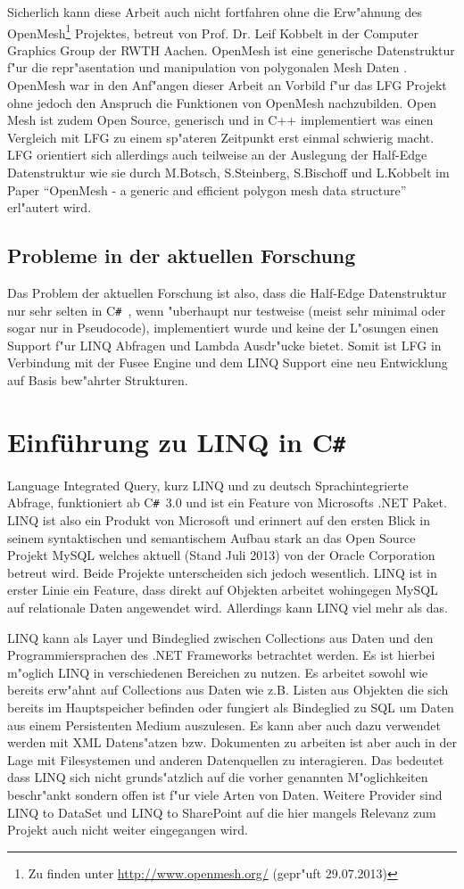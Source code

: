 \documentclass[pagesize, paper=a4, fontsize=12pt,titlepage=true, headings=small, headnosepline, abstractoff, liststotoc, nochapterprefix, plainheadsepline]{scrreprt}
\newcommand{\CS}{C\texttt{\#}}
\newcommand{\CSS}{C\texttt{\# }}
\newcommand{\HES}{Half-Edge Datenstruktur }
\begin{document}
Sicherlich kann diese Arbeit auch nicht fortfahren ohne die Erw"ahnung des OpenMesh\footnote{Zu finden unter \url{http://www.openmesh.org/} (gepr"uft 29.07.2013)} Projektes, betreut von Prof. Dr. Leif Kobbelt in der Computer Graphics Group der RWTH Aachen. OpenMesh ist eine generische Datenstruktur f"ur die repr"asentation und manipulation von polygonalen Mesh Daten \cite{Kobbelt.2013}. OpenMesh war in den Anf"angen dieser Arbeit an Vorbild f"ur das LFG Projekt ohne jedoch den Anspruch die Funktionen von OpenMesh nachzubilden. Open Mesh ist zudem Open Source, generisch und in C++ implementiert was einen Vergleich mit LFG zu einem sp"ateren Zeitpunkt erst einmal schwierig macht. LFG orientiert sich allerdings auch teilweise an der Auslegung der \HES wie sie durch M.Botsch, S.Steinberg, S.Bischoff und L.Kobbelt im Paper "`OpenMesh - a generic and efficient polygon mesh data structure"' \cite{Botsch.2002} erl"autert wird.
		\subsection {Probleme in der aktuellen Forschung}
			Das Problem der aktuellen Forschung ist also, dass die \HES nur sehr selten in \CSS, wenn "uberhaupt nur testweise (meist sehr minimal oder sogar nur in Pseudocode), implementiert wurde und keine der L"osungen einen Support f"ur LINQ Abfragen und Lambda Ausdr"ucke bietet. Somit ist LFG in Verbindung mit der Fusee Engine und dem LINQ Support eine neu Entwicklung auf Basis bew"ahrter Strukturen.
	\section {Einführung zu LINQ in \CS}
		Language Integrated Query, kurz LINQ und zu deutsch Sprachintegrierte Abfrage, funktioniert ab \CSS 3.0 und ist ein Feature von Microsofts .NET Paket. LINQ ist also ein Produkt von Microsoft und erinnert auf den ersten Blick in seinem syntaktischen und semantischem Aufbau stark an das Open Source Projekt MySQL welches aktuell (Stand Juli 2013) von der Oracle Corporation betreut wird. Beide Projekte unterscheiden sich jedoch wesentlich. LINQ ist in erster Linie ein Feature, dass direkt auf Objekten arbeitet wohingegen MySQL auf relationale Daten angewendet wird. Allerdings kann LINQ viel mehr als das.

LINQ kann als Layer und Bindeglied zwischen Collections aus Daten und den Programmiersprachen des .NET Frameworks betrachtet werden. Es ist hierbei m"oglich LINQ in verschiedenen Bereichen zu nutzen. Es arbeitet sowohl wie bereits erw"ahnt auf Collections aus Daten wie z.B. Listen aus Objekten die sich bereits im Hauptspeicher befinden oder fungiert als Bindeglied zu SQL um Daten aus einem Persistenten Medium auszulesen. Es kann aber auch dazu verwendet werden mit XML Datens"atzen bzw. Dokumenten zu arbeiten ist aber auch in der Lage mit Filesystemen und anderen Datenquellen zu interagieren. Das bedeutet dass LINQ sich nicht grunds"atzlich auf die vorher genannten M"oglichkeiten beschr"ankt sondern offen ist f"ur viele Arten von Daten. Weitere Provider sind LINQ to DataSet und LINQ to SharePoint auf die hier mangels Relevanz zum Projekt auch nicht weiter eingegangen wird.
\end{document}
